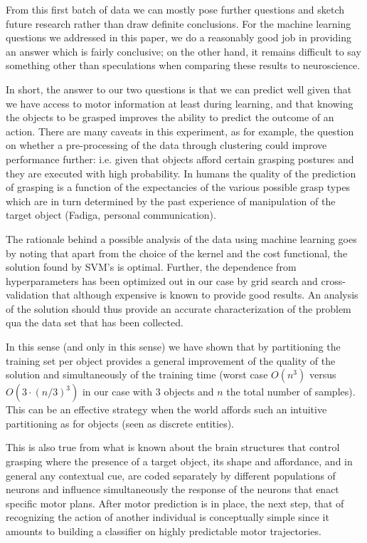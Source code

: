 From this first batch of data we can mostly pose further questions and
sketch future research rather than draw definite conclusions. For the
machine learning questions we addressed in this paper, we do a
reasonably good job in providing an answer which is fairly conclusive;
on the other hand, it remains difficult to say something other than
speculations when comparing these results to neuroscience.

In short, the answer to our two questions is that we can predict well
given that we have access to motor information at least during
learning, and that knowing the objects to be grasped improves the
ability to predict the outcome of an action. There are many caveats in
this experiment, as for example, the question on whether a
pre-processing of the data through clustering could improve
performance further: i.e.  given that objects afford certain grasping
postures and they are executed with high probability. In humans the
quality of the prediction of grasping is a function of the
expectancies of the various possible grasp types which are in turn
determined by the past experience of manipulation of the target object
(Fadiga, personal communication).

The rationale behind a possible analysis of the data using machine
learning goes by noting that apart from the choice of the kernel and
the cost functional, the solution found by SVM's is optimal. Further,
the dependence from hyperparameters has been optimized out in our case
by grid search and cross-validation that although expensive is known
to provide good results. An analysis of the solution should thus
provide an accurate characterization of the problem qua the data set
that has been collected.

In this sense (and only in this sense) we have shown that by
partitioning the training set per object provides a general
improvement of the quality of the solution and simultaneously of the
training time (worst case $O(n^3)$ versus $O(3 \cdot (n/3)^3)$ in our
case with $3$ objects and $n$ the total number of samples). This can
be an effective strategy when the world affords such an intuitive
partitioning as for objects (seen as discrete entities).

This is also true from what is known about the brain structures that
control grasping where the presence of a target object, its shape and
affordance, and in general any contextual cue, are coded separately by
different populations of neurons and influence simultaneously the
response of the neurons that enact specific motor plans. After motor
prediction is in place, the next step, that of recognizing the action
of another individual is conceptually simple since it amounts to
building a classifier on highly predictable motor trajectories.

